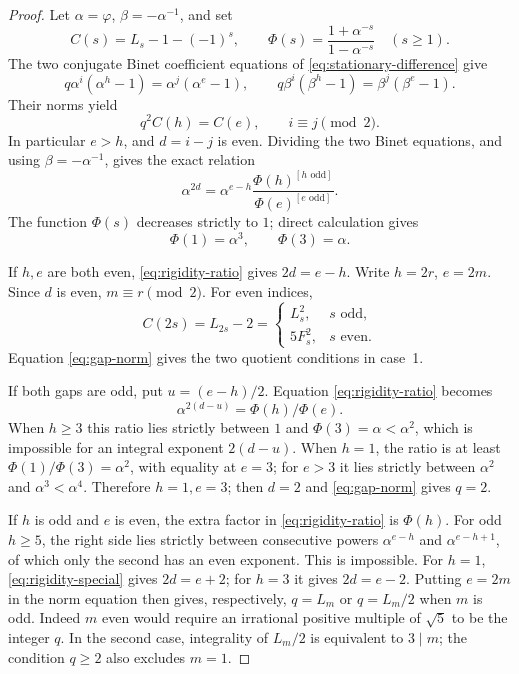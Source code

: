 \documentclass[11pt]{article}
\begin{document}
\begin{proof}
Let \(\alpha=\varphi\), \(\beta=-\alpha^{-1}\), and set
\[
C(s)=L_s-1-(-1)^s,\qquad
\Phi(s)=\frac{1+\alpha^{-s}}{1-\alpha^{-s}}\quad(s\ge1).
\]
The two conjugate Binet coefficient equations of
\eqref{eq:stationary-difference} give
\[
q\alpha^i(\alpha^h-1)=\alpha^j(\alpha^e-1),
\qquad
q\beta^i(\beta^h-1)=\beta^j(\beta^e-1).
\]
Their norms yield
\begin{equation}\label{eq:gap-norm}
q^2 C(h)=C(e),\qquad i\equiv j\pmod2.
\end{equation}
In particular \(e>h\), and \(d=i-j\) is even.
Dividing the two Binet equations, and using
\(\beta=-\alpha^{-1}\), gives the exact relation
\begin{equation}\label{eq:rigidity-ratio}
\alpha^{2d}=\alpha^{e-h}
\frac{\Phi(h)^{[h\text{ odd}]}}
     {\Phi(e)^{[e\text{ odd}]}}.
\end{equation}
The function \(\Phi(s)\) decreases strictly to \(1\);
direct calculation gives
\begin{equation}\label{eq:rigidity-special}
\Phi(1)=\alpha^3,\qquad \Phi(3)=\alpha.
\end{equation}

If \(h,e\) are both even, \eqref{eq:rigidity-ratio}
gives \(2d=e-h\). Write \(h=2r\), \(e=2m\).
Since \(d\) is even, \(m\equiv r\pmod2\).
For even indices,
\[
C(2s)=L_{2s}-2=
\begin{cases}
L_s^2,&s\text{ odd},\\
5F_s^2,&s\text{ even}.
\end{cases}
\]
Equation \eqref{eq:gap-norm} gives the two quotient
conditions in case~1.

If both gaps are odd, put \(u=(e-h)/2\).
Equation \eqref{eq:rigidity-ratio} becomes
\[
\alpha^{2(d-u)}=\Phi(h)/\Phi(e).
\]
When \(h\ge3\) this ratio lies strictly between
\(1\) and \(\Phi(3)=\alpha<\alpha^2\),
which is impossible for an integral exponent \(2(d-u)\).
When \(h=1\), the ratio is at least
\(\Phi(1)/\Phi(3)=\alpha^2\), with equality at \(e=3\);
for \(e>3\) it lies strictly between
\(\alpha^2\) and \(\alpha^3<\alpha^4\).
Therefore \(h=1,e=3\); then \(d=2\) and
\eqref{eq:gap-norm} gives \(q=2\).

If \(h\) is odd and \(e\) is even, the extra factor in
\eqref{eq:rigidity-ratio} is \(\Phi(h)\).
For odd \(h\ge5\), the right side lies strictly
between consecutive powers \(\alpha^{e-h}\) and
\(\alpha^{e-h+1}\), of which only the second has an
even exponent. This is impossible. For \(h=1\),
\eqref{eq:rigidity-special} gives \(2d=e+2\);
for \(h=3\) it gives \(2d=e-2\).
Putting \(e=2m\) in the norm equation then gives,
respectively, \(q=L_m\) or \(q=L_m/2\) when \(m\)
is odd. Indeed \(m\) even would require an irrational
positive multiple of \(\sqrt5\) to be the integer \(q\).
In the second case, integrality of \(L_m/2\) is
equivalent to \(3\mid m\); the condition \(q\ge2\)
also excludes \(m=1\).


\end{proof}
\end{document}
